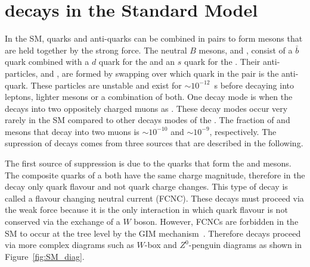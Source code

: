 \section[$B^0_{(s)}\to \mu^+ \mu^-$ decays in the Standard Model]{ decays in the Standard Model}
\label{sec:bsmumu_in_SM}
In the SM, quarks and anti-quarks can be combined in pairs to form mesons that are held together by the strong force. The neutral $B$ mesons, \bd and \bs, consist of a $\bar{b}$ quark combined with a $d$ quark for the \bd and an $s$ quark for the \bs. Their anti-particles, \barbd and \barbs, are formed by swapping over which quark in the pair is the anti-quark. These particles are unstable and exist for $\sim10^{-12}$~s before decaying into leptons, lighter mesons or a combination of both. One decay mode is when the \bsd decays into two oppositely charged muons as \bmumu. %
These decay modes occur very rarely in the SM compared to other decays modes of the \bsd. The fraction of \bd and \bs mesons that decay into two muons is $\sim10^{-10}$ and $\sim10^{-9}$, respectively. The supression of \bmumu decays comes from three sources that are described in the following.


The first source of suppression is due to the quarks that form the \bd and \bs mesons. The composite quarks of a \bsd both have the same charge magnitude, therefore in the decay \bmumu only quark flavour and not quark charge changes. This type of decay is called a flavour changing neutral current (FCNC). These decays must proceed via the weak force because it is the only interaction in which quark flavour is not conserved via the exchange of a $W$ boson. However, FCNCs are forbidden in the SM to occur at the tree level by the GIM mechanism~\cite{PhysRevD.2.1285}. Therefore \bmumu decays proceed via more complex diagrams such as $W$-box and $Z^0$-penguin diagrams as shown in Figure~\ref{fig:SM_diag}.


